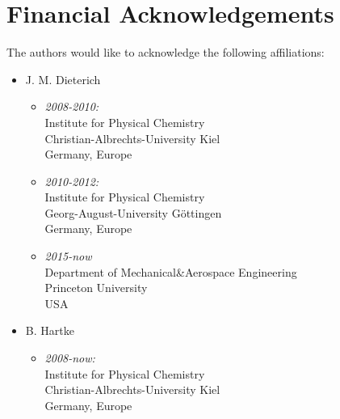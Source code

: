 \documentclass[a4paper,10pt]{scrbook}
\begin{document}
\section{Financial Acknowledgements}
The authors would like to acknowledge the following affiliations:
\begin{itemize}
 \item J. M. Dieterich
 \begin{itemize}
   \item \textit{2008-2010:}\\Institute for Physical 
Chemistry\\Christian-Albrechts-University Kiel\\Germany, Europe
   \item \textit{2010-2012:}\\Institute for Physical 
Chemistry\\Georg-August-University G\"ottingen\\Germany, Europe
   \item \textit{2015-now}\\Department of Mechanical\&Aerospace 
Engineering\\Princeton University\\USA
 \end{itemize}
 \item B. Hartke
 \begin{itemize}
   \item \textit{2008-now:}\\Institute for Physical 
Chemistry\\Christian-Albrechts-University Kiel\\Germany, Europe
 \end{itemize}
\end{itemize}
\end{document}
